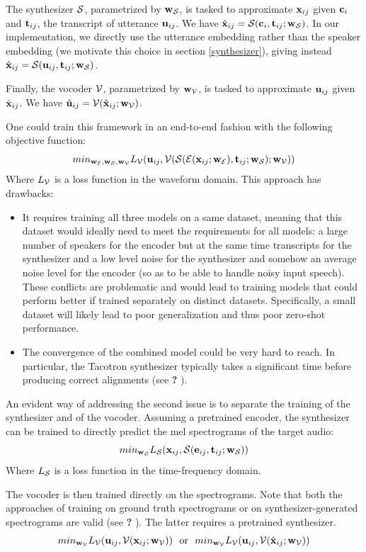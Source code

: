 \documentclass[a4paper, oneside, 12pt, english]{article}
\newcommand{\rw}{\color{red}\textbf{?} \color{black}}		%
\begin{document}
The synthesizer $\mathcal{S}$, parametrized by $\mathbf{w}_{\mathcal{S}}$, is tasked to approximate $\mathbf{x}_{ij}$ given $\mathbf{c}_i$ and $\mathbf{t}_{ij}$, the transcript of utterance $\mathbf{u}_{ij}$. We have $\hat{\mathbf{x}}_{ij} = \mathcal{S}(\mathbf{c}_i, \mathbf{t}_{ij}; \mathbf{w}_{\mathcal{S}})$. In our implementation, we directly use the utterance embedding rather than the speaker embedding (we motivate this choice in section \ref{synthesizer}), giving instead $\hat{\mathbf{x}}_{ij} = \mathcal{S}(\mathbf{u}_{ij}, \mathbf{t}_{ij}; \mathbf{w}_{\mathcal{S}})$.

Finally, the vocoder $\mathcal{V}$, parametrized by $\mathbf{w}_{\mathcal{V}}$, is tasked to approximate $\mathbf{u}_{ij}$ given $\hat{\mathbf{x}}_{ij}$. We have $\hat{\mathbf{u}}_{ij} = \mathcal{V}(\hat{\mathbf{x}}_{ij}; \mathbf{w}_{\mathcal{V}})$.

One could train this framework in an end-to-end fashion with the following objective function:
$$ min_{\mathbf{w}_{\mathcal{E}}, \mathbf{w}_{\mathcal{S}}, \mathbf{w}_{\mathcal{V}}} L_{\mathcal{V}}(\mathbf{u}_{ij}, \mathcal{V}(\mathcal{S}(\mathcal{E}(\mathbf{x}_{ij}; \mathbf{w}_{\mathcal{E}}), \mathbf{t}_{ij}; \mathbf{w}_{\mathcal{S}}); \mathbf{w}_{\mathcal{V}})) $$
Where $L_{\mathcal{V}}$ is a loss function in the waveform domain. This approach has drawbacks:
\begin{itemize}
	\item It requires training all three models on a same dataset, meaning that this dataset would ideally need to meet the requirements for all models: a large number of speakers for the encoder but at the same time transcripts for the synthesizer and a low level noise for the synthesizer and somehow an average noise level for the encoder (so as to be able to handle noisy input speech). These conflicts are problematic and would lead to training models that could perform better if trained separately on distinct datasets. Specifically, a small dataset will likely lead to poor generalization and thus poor zero-shot performance.
	\item The convergence of the combined model could be very hard to reach. In particular, the Tacotron synthesizer typically takes a significant time before producing correct alignments (see \rw).
\end{itemize}

An evident way of addressing the second issue is to separate the training of the synthesizer and of the vocoder. Assuming a pretrained encoder, the synthesizer can be trained to directly predict the mel spectrograms of the target audio:
$$ min_{\mathbf{w}_{\mathcal{S}}} L_{\mathcal{S}}(\mathbf{x}_{ij}, \mathcal{S}(\mathbf{e}_{ij}, \mathbf{t}_{ij}; \mathbf{w}_{\mathcal{S}})) $$
Where $L_{\mathcal{S}}$ is a loss function in the time-frequency domain. 

The vocoder is then trained directly on the spectrograms. Note that both the approaches of training on ground truth spectrograms or on synthesizer-generated spectrograms are valid (see \rw). The latter requires a pretrained synthesizer.
$$ min_{\vw_\voc} L_\voc(\vu_{ij}, \voc(\vx_{ij}; \vw_\voc)) \ \ \text{or} \ \ 
   min_{\vw_\voc} L_\voc(\vu_{ij}, \voc(\hat\vx_{ij}; \vw_\voc)) $$
\end{document}
